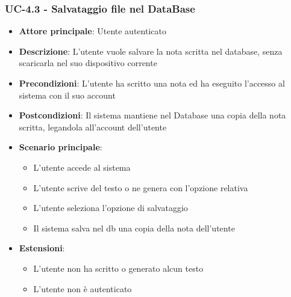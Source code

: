 \documentclass[11pt,a4paper]{article}
\begin{document}
\subsubsection{UC-4.3 - Salvataggio file nel DataBase}
\begin{itemize}
    \item \textbf{Attore principale}: Utente autenticato
    \item \textbf{Descrizione}: L'utente vuole salvare la nota scritta nel database, senza scaricarla nel suo dispositivo corrente
    \item \textbf{Precondizioni}: L'utente ha scritto una nota ed ha eseguito l'accesso al sistema con il suo account
    \item \textbf{Postcondizioni}: Il sistema mantiene nel Database una copia della nota scritta, legandola all'account dell'utente
    \item \textbf{Scenario principale}:
        \begin{itemize}
            \item L'utente accede al sistema
            \item L'utente scrive del testo o ne genera con l'opzione relativa
            \item L'utente seleziona l'opzione di salvataggio
            \item Il sistema salva nel db una copia della nota dell'utente
        \end{itemize}
    \item \textbf{Estensioni}:
        \begin{itemize}
            \item L'utente non ha scritto o generato alcun testo
            \item L'utente non è autenticato
        \end{itemize}
\end{itemize}
\end{document}

